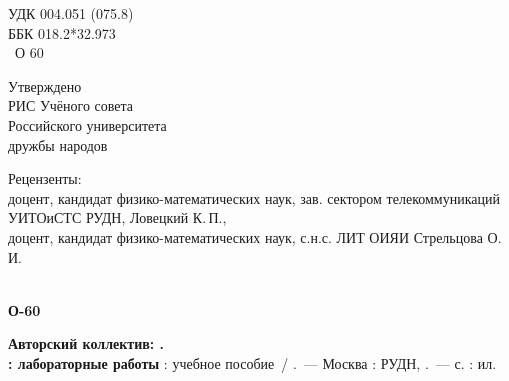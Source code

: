 \thispagestyle{empty}



\begin{minipage}[t]{0.4\linewidth}
\begin{flushleft}
УДК  004.051 (075.8) %
\\
ББК  018.2*32.973
\\
\ \qquad О 60
\\
\end{flushleft}
\end{minipage}
\hfill
\begin{minipage}[t]{0.4\linewidth}
\begin{flushright}
Утверждено \\
РИС Учёного совета \\
Российского университета \\
дружбы народов \\
\end{flushright}
\end{minipage}

\vspace{1cm}

\begin{flushleft}
Рецензенты: \\
доцент, кандидат физико-математических наук, зав. сектором
телекоммуникаций УИТОиСТС РУДН, Ловецкий К.\,П.,\\
доцент, кандидат физико-математических наук, с.н.с. ЛИТ ОИЯИ
Стрельцова О.\,И.
\end{flushleft}
\bigskip
\bigskip
\bigskip


\noindent
\begin{minipage}[t]{0.08\linewidth}
\begin{flushleft}
\mbox{}\\
\textbf{О-60} \\
\end{flushleft}
\end{minipage}
\hfill
\begin{minipage}[t]{0.9\linewidth}
\begin{flushleft}
  \textbf{Авторский коллектив: \bookauthor{}.} \\
  \textbf{\booktitle{}: лабораторные работы} : учебное пособие~/
  \bookauthor{}.~---
  Москва : РУДН, \bookyear{}.~--- \pageref{MyLastPage} с. : ил. \\
\end{flushleft}
\end{minipage}


